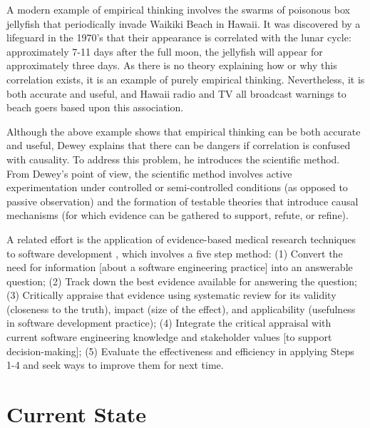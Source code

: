 A modern example of empirical thinking involves the swarms of poisonous box
jellyfish that periodically invade Waikiki Beach in Hawaii.  It was
discovered by a lifeguard in the 1970's that their appearance is correlated
with the lunar cycle: approximately 7-11 days after the full moon, the
jellyfish will appear for approximately three days.  As there is no
theory explaining how or why this correlation exists, it is an example of
purely empirical thinking.  Nevertheless, it is both accurate and useful,
and Hawaii radio and TV all broadcast warnings to beach goers based upon
this association.

Although the above example shows that empirical thinking can be
both accurate and useful, Dewey explains that there can be dangers if
correlation is confused with causality. To address this problem, he
introduces the scientific method.  From Dewey's point of view, the
scientific method involves active experimentation under controlled or
semi-controlled conditions (as opposed to passive observation) and the
formation of testable theories that introduce causal mechanisms (for which
evidence can be gathered to support, refute, or refine).  

A related effort is the application of evidence-based medical research
techniques to software development \citep{Kitchenham04,Kitchenham04a},
which involves a five step method: (1) Convert the need for information
[about a software engineering practice] into an answerable question; (2)
Track down the best evidence available for answering the question; (3)
Critically appraise that evidence using systematic review for its validity
(closeness to the truth), impact (size of the effect), and applicability
(usefulness in software development practice); (4) Integrate the critical
appraisal with current software engineering knowledge and stakeholder
values [to support decision-making]; (5) Evaluate the effectiveness and
efficiency in applying Steps 1-4 and seek ways to improve them for next
time.  


\section{Current State}
\label{sec:current-state}


